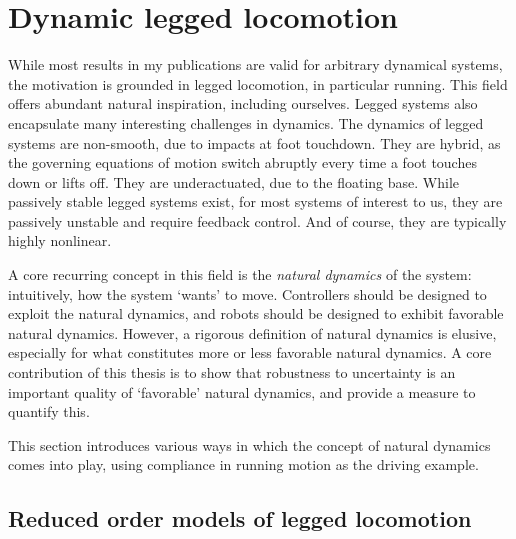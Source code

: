 \section{Dynamic legged locomotion}
While most results in my publications are valid for arbitrary dynamical systems, the motivation is grounded in legged locomotion, in particular running. This field offers abundant natural inspiration, including ourselves. Legged systems also encapsulate many interesting challenges in dynamics. The dynamics of legged systems are non-smooth, due to impacts at foot touchdown. They are hybrid, as the governing equations of motion switch abruptly every time a foot touches down or lifts off. They are underactuated, due to the floating base. While passively stable legged systems exist, for most systems of interest to us, they are passively unstable and require feedback control. And of course, they are typically highly nonlinear. \par
A core recurring concept in this field is the \emph{natural dynamics} of the system: intuitively, how the system `wants' to move. Controllers should be designed to exploit the natural dynamics, and robots should be designed to exhibit favorable natural dynamics. However, a rigorous definition of natural dynamics is elusive, especially for what constitutes more or less favorable natural dynamics. A core contribution of this thesis is to show that robustness to uncertainty is an important quality of `favorable' natural dynamics, and provide a measure to quantify this. \par
This section introduces various ways in which the concept of natural dynamics comes into play, using compliance in running motion as the driving example.

\subsection{Reduced order models of legged locomotion}\label{subs:models}

